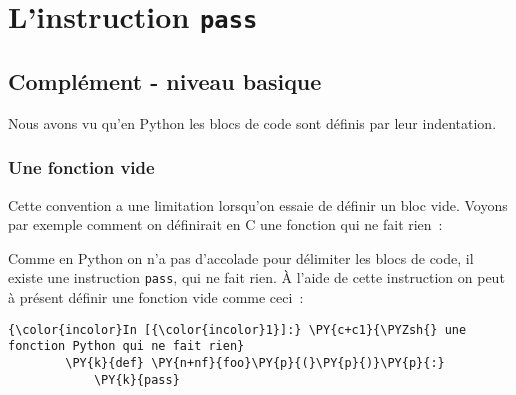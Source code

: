     
    
    
    

    

    \hypertarget{linstruction-pass}{%
\section{\texorpdfstring{L'instruction
\texttt{pass}}{L'instruction pass}}\label{linstruction-pass}}

    \hypertarget{compluxe9ment---niveau-basique}{%
\subsection{Complément - niveau
basique}\label{compluxe9ment---niveau-basique}}

    Nous avons vu qu'en Python les blocs de code sont définis par leur
indentation.

    \hypertarget{une-fonction-vide}{%
\subsubsection{Une fonction vide}\label{une-fonction-vide}}

    Cette convention a une limitation lorsqu'on essaie de définir un bloc
vide. Voyons par exemple comment on définirait en C une fonction qui ne
fait rien~:

    \begin{Shaded}
\begin{Highlighting}[frame=lines,framerule=0.6mm,rulecolor=\color{asisframecolor}]
\end{Highlighting}
\end{Shaded}

    Comme en Python on n'a pas d'accolade pour délimiter les blocs de code,
il existe une instruction \texttt{pass}, qui ne fait rien. À l'aide de
cette instruction on peut à présent définir une fonction vide comme
ceci~:

    \begin{Verbatim}[commandchars=\\\{\},frame=single,framerule=0.3mm,rulecolor=\color{cellframecolor}]
{\color{incolor}In [{\color{incolor}1}]:} \PY{c+c1}{\PYZsh{} une fonction Python qui ne fait rien}
        \PY{k}{def} \PY{n+nf}{foo}\PY{p}{(}\PY{p}{)}\PY{p}{:}
            \PY{k}{pass}
\end{Verbatim}


